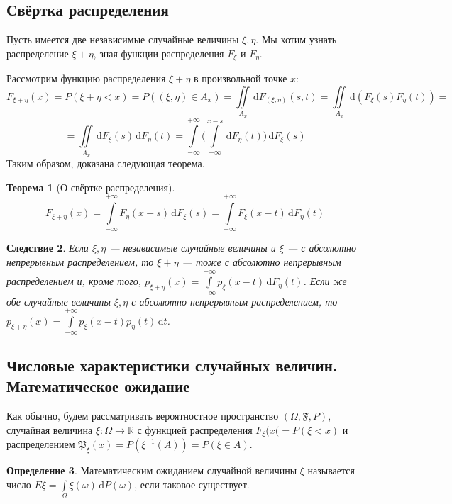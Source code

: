 \documentclass[11pt,openany,a4paper]{scrartcl}
\theoremstyle{plain}
\newtheorem{theorem}{Теорема}[subsection]
\newtheorem{corollary}[theorem]{Следствие}
\theoremstyle{definition}
\newtheorem{definition}[theorem]{Определение}
\newcommand\mb{\mathbb}
\newcommand\real{\mb R}
\newcommand{\dif}{\, \mathrm d}
\begin{document}
\subsection{Свёртка распределения}

Пусть имеется две независимые случайные величины $\xi, \eta$. Мы хотим узнать
распределение $\xi + \eta$, зная функции распределения $F_\xi$ и $F_\eta$.

Рассмотрим функцию распределения $\xi + \eta$ в произвольной точке $x$:
$$
F_{\xi + \eta}(x) = P(\xi + \eta < x) = P((\xi, \eta) \in A_x) = 
\iint\limits_{A_x} \dif F_{(\xi, \eta)}(s, t) =
\iint\limits_{A_x} \dif(F_\xi(s)F_\eta(t)) =
$$
$$
= \iint\limits_{A_x} \dif F_\xi(s)\dif F_\eta(t) =
\int\limits_{-\infty}^{+\infty}
\Bigg(\int\limits_{-\infty}^{x-s} \dif F_\eta(t)\Bigg) \dif F_\xi(s)
$$
Таким образом, доказана следующая теорема.
\begin{theorem}[О свёртке распределения]
    $$
    F_{\xi + \eta}(x) = \int\limits_{-\infty}^{+\infty} F_\eta(x-s)
    \dif F_\xi(s) =
    \int\limits_{-\infty}^{+\infty} F_\xi(x-t) \dif F_\eta(t)
    $$
\end{theorem}
\begin{corollary}
    Если $\xi, \eta$ — независимые случайные величины и $\xi$ — с абсолютно
    непрерывным распределением, то $\xi + \eta$ — тоже с абсолютно непрерывным
    распределением и, кроме того, $p_{\xi + \eta}(x) =
    \int\limits_{-\infty}^{+\infty} p_\xi(x - t) \dif F_\eta(t)$. Если же
    обе случайные величины $\xi, \eta$ с абсолютно непрерывным распределением,
    то $p_{\xi + \eta}(x) = \int\limits_{-\infty}^{+\infty}
    p_\xi(x-t)p_\eta(t)\dif t$.
\end{corollary}

\subsection{Числовые характеристики случайных величин. Математическое ожидание}

Как обычно, будем рассматривать вероятностное пространство
$(\Omega, \mathfrak{F}, P)$, случайная величина $\xi: \Omega \to \real$ с функцией
распределения $F_\xi(x( = P(\xi < x)$ и распределением $\mathfrak P_\xi(x) =
P(\xi^{-1}(A)) = P(\xi \in A)$.

\begin{definition}
    Математическим ожиданием случайной величины $\xi$ называется число
    $E\xi = \int\limits_\Omega \xi(\omega) \dif P(\omega)$, если таковое
    существует.
\end{definition}
\end{document}
